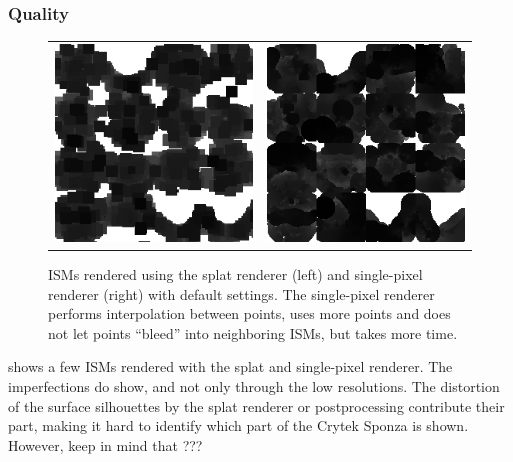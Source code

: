 \subsubsection{Quality}
\label{sec:results:ism:quality}

\begin{figure}[htb]
\centering
  \begin{tabular}{@{}cc@{}}
    \includegraphics[width=.48\textwidth]{screenshots/ism_splat_cropped} &
    \includegraphics[width=.48\textwidth]{screenshots/ism_single_pixel_cropped}
  \end{tabular}
  \caption{ISMs rendered using the splat renderer (left) and single-pixel renderer (right) with default settings. The single-pixel renderer performs interpolation between points, uses more points and does not let points ``bleed'' into neighboring ISMs, but takes more time.}
  \label{fig:results:isms}
\end{figure}

 shows a few ISMs rendered with the splat and single-pixel renderer. The imperfections do show, and not only through the low resolutions. The distortion of the surface silhouettes by the splat renderer or postprocessing contribute their part, making it hard to identify which part of the Crytek Sponza is shown. However, keep in mind that ???

